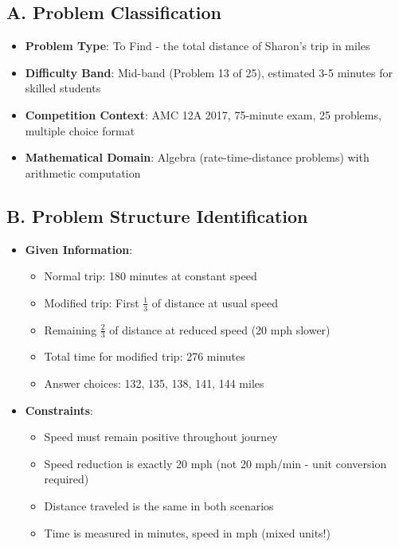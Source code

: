 \documentclass[11pt]{article}
\begin{document}
\begin{problemconfigbox}
\subsection*{A. Problem Classification}
\begin{itemize}[leftmargin=*]
    \item \textbf{Problem Type}: To Find - the total distance of Sharon's trip in miles
    \item \textbf{Difficulty Band}: Mid-band (Problem 13 of 25), estimated 3-5 minutes for skilled students
    \item \textbf{Competition Context}: AMC 12A 2017, 75-minute exam, 25 problems, multiple choice format
    \item \textbf{Mathematical Domain}: Algebra (rate-time-distance problems) with arithmetic computation
\end{itemize}

\subsection*{B. Problem Structure Identification}
\begin{itemize}[leftmargin=*]
    \item \textbf{Given Information}: 
    \begin{itemize}[leftmargin=*]
        \item Normal trip: 180 minutes at constant speed
        \item Modified trip: First $\frac{1}{3}$ of distance at usual speed
        \item Remaining $\frac{2}{3}$ of distance at reduced speed (20 mph slower)
        \item Total time for modified trip: 276 minutes
        \item Answer choices: 132, 135, 138, 141, 144 miles
    \end{itemize}
    
    \item \textbf{Constraints}: 
    \begin{itemize}[leftmargin=*]
        \item Speed must remain positive throughout journey
        \item Speed reduction is exactly 20 mph (not 20 mph/min - unit conversion required)
        \item Distance traveled is the same in both scenarios
        \item Time is measured in minutes, speed in mph (mixed units!)
    \end{itemize}
    

\end{itemize}
\end{problemconfigbox}
\end{document}
